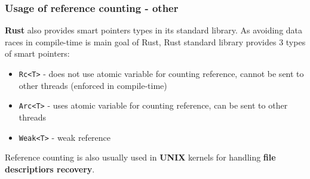 \documentclass[presentation]{beamer}
\begin{document}
\begin{frame}[fragile]
  \frametitle{Usage of reference counting - other} 
  \justifying
  \textbf{Rust} also provides smart pointers types in its standard library. As avoiding data races in compile-time is main goal of Rust, Rust standard library provides 3 types of smart pointers: 
  \begin{itemize}
    \item \texttt{Rc<T>} - does not use atomic variable for counting reference, cannot be sent to other threads (enforced in compile-time)
    \item \texttt{Arc<T>} - uses atomic variable for counting reference, can be sent to other threads
    \item \texttt{Weak<T>} - weak reference
  \end{itemize}
  \vspace{20pt}
  Reference counting is also usually used in \textbf{UNIX} kernels for handling \textbf{file descriptiors recovery}.
\end{frame}
\end{document}
